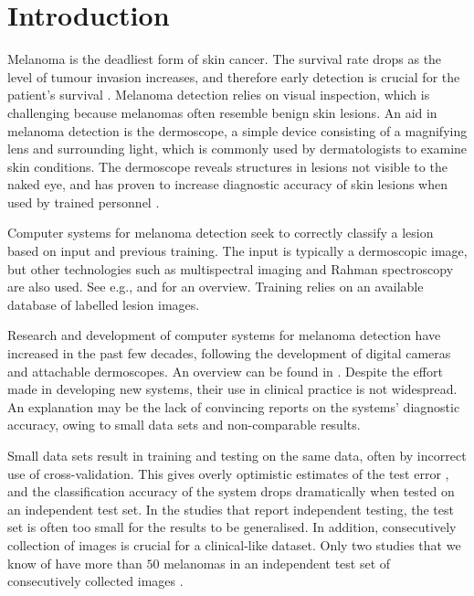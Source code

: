\documentclass[10pt,letterpaper]{article}
\begin{document}
\linenumbers

\section*{Introduction}
Melanoma is the deadliest form of skin cancer. The survival rate drops as the level of tumour invasion increases, and therefore early detection is crucial for the patient's survival \cite{AmericanCancerSociety2016Cancer, CancerRegistryofNorway2016Cancer}. Melanoma detection relies on visual inspection, which is challenging because melanomas often resemble benign skin lesions. 
An aid in melanoma detection is the dermoscope, a simple device consisting of a magnifying lens and surrounding light, which is commonly used by dermatologists to examine skin conditions. 
The dermoscope reveals structures in lesions not visible to the naked eye, and has proven to increase diagnostic accuracy of skin lesions when used by trained personnel \cite{Kittler2002Diagnostic}.

Computer systems for melanoma detection seek to correctly classify a lesion based on input and previous training. 
The input is typically a dermoscopic image, but other technologies such as multispectral imaging and Rahman spectroscopy are also used. 
See e.g., \cite{Fink2016Noninvasive} and \cite{Masood2013Computer} for an overview. 
Training relies on an available database of labelled lesion images. 

Research and development of computer systems for melanoma detection have increased in the past few decades, following the development of digital cameras and attachable dermoscopes. 
An overview can be found in \cite{Korotkov2012Computerized}. 
Despite the effort made in developing new systems, their use in clinical practice is not widespread. 
An explanation may be the lack of convincing reports on the systems' diagnostic accuracy, owing to small data sets and non-comparable results. 

Small data sets result in training and testing on the same data, often by incorrect use of cross-validation. 
This gives overly optimistic estimates of the test error \cite{Smialowski2010Pitfalls,Hastie2009Elements}, and the classification accuracy of the system drops dramatically when tested on an independent test set. 
In the studies that report independent testing, the test set is often too small for the results to be generalised. 
In addition, consecutively collection of images is crucial for a clinical-like dataset. 
Only two studies that we know of have more than $50$ melanomas in an independent test set of consecutively collected images \cite{Monheit2011Performance, Malvehy2014Clinical}. 
\end{document}
